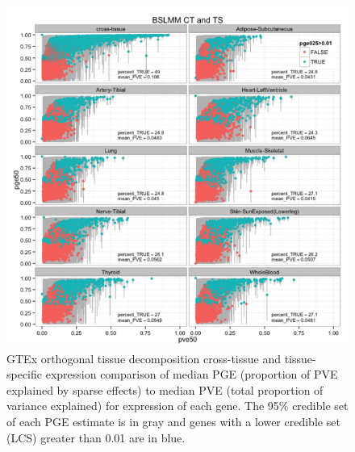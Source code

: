 \documentclass[]{article}
\begin{document}
\begin{figure}[htbp]
\centering
\includegraphics{GenArch_manuscript_files/figure-latex/CTTSbslmm-1.pdf}
\caption{GTEx orthogonal tissue decomposition cross-tissue and
tissue-specific expression comparison of median PGE (proportion of PVE
explained by sparse effects) to median PVE (total proportion of variance
explained) for expression of each gene. The 95\% credible set of each
PGE estimate is in gray and genes with a lower credible set (LCS)
greater than 0.01 are in blue.}
\end{figure}
\end{document}
